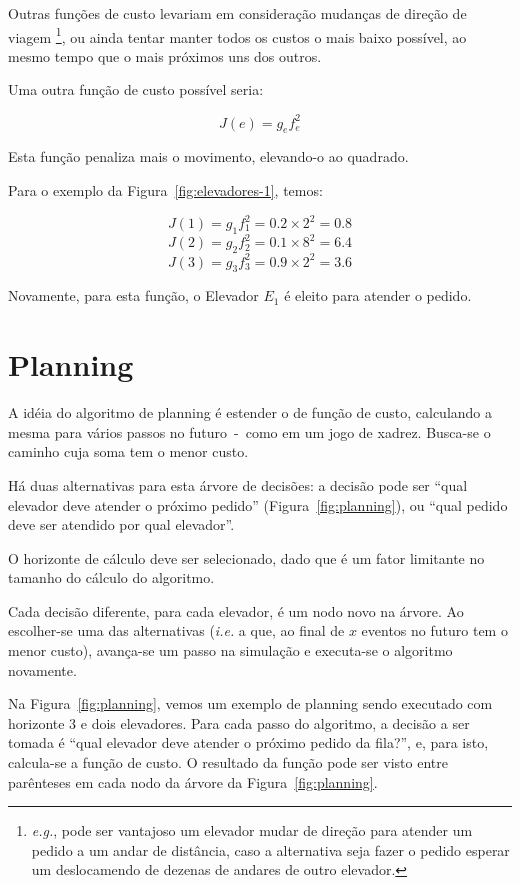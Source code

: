 Outras funções de custo levariam em consideração mudanças de direção de viagem
\footnote{\textit{e.g.}, pode ser vantajoso um elevador mudar de direção para atender um
pedido a um andar de distância, caso a alternativa seja fazer o pedido esperar
um deslocamendo de dezenas de andares de outro elevador.}, ou ainda tentar
manter todos os custos o mais baixo possível, ao mesmo tempo que o mais
próximos uns dos outros.

Uma outra função de custo possível seria:

\[J(e) = g_{e}f_{e}^{2}\]

Esta função penaliza mais o movimento, elevando-o ao quadrado.

Para o exemplo da Figura~\ref{fig:elevadores-1}, temos:

\[J(1) = g_{1}f_{1}^{2} = 0.2 \times 2^2 = 0.8\]
\[J(2) = g_{2}f_{2}^{2} = 0.1 \times 8^2 = 6.4\]
\[J(3) = g_{3}f_{3}^{2} = 0.9 \times 2^2 = 3.6\]

Novamente, para esta função, o Elevador $E_{1}$ é eleito para atender o pedido.

\section{Planning}


A idéia do algoritmo de planning é estender o de função de custo, calculando a
mesma para vários passos no futuro~-~como em um jogo de xadrez. Busca-se o
caminho cuja soma tem o menor custo.

Há duas alternativas para esta árvore de decisões: a decisão pode ser ``qual
elevador deve atender o próximo pedido'' (Figura~\ref{fig:planning}),
ou ``qual pedido deve ser atendido por qual elevador''. %

O horizonte de cálculo deve ser selecionado, dado que é um fator limitante no
tamanho do cálculo do algoritmo.

Cada decisão diferente, para cada elevador, é um nodo novo na árvore. Ao
escolher-se uma das alternativas (\textit{i.e.} a que, ao final de $x$ eventos
no futuro tem o menor custo), avança-se um passo na simulação e executa-se o
algoritmo novamente.

Na Figura~\ref{fig:planning}, vemos um exemplo de planning sendo executado com
horizonte 3 e dois elevadores. Para cada passo do algoritmo, a decisão a ser
tomada é ``qual elevador deve atender o próximo pedido da fila?'', e, para isto,
calcula-se a função de custo. O resultado da função pode ser visto entre
parênteses em cada nodo da árvore da Figura~\ref{fig:planning}.

